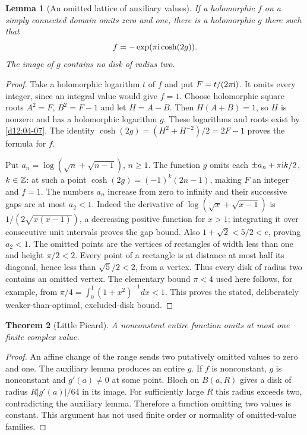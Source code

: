 \documentclass[11pt,a4paper,openany]{book}
\newtheorem{theorem}{Theorem}[chapter]
\newtheorem{lemma}[theorem]{Lemma}
\theoremstyle{definition}
\theoremstyle{remark}\newtheorem{remark}[theorem]{Remark}
\newcommand{\family}[1]{}
\begin{document}
\begin{lemma}[An omitted lattice of auxiliary values]\label{d12:23:auxiliary}
If a holomorphic $f$ on a simply connected domain omits zero and one,
there is a holomorphic $g$ there such that
\[
                      f=-\exp(\pi\mathrm i\cosh(2g)).
\]
The image of $g$ contains no disk of radius two.
\end{lemma}
\begin{proof}
Take a holomorphic logarithm $t$ of $f$ and put $F=t/(2\pi\mathrm i)$.
It omits every integer, since an integral value would give $f=1$.
Choose holomorphic square roots $A^2=F$, $B^2=F-1$ and let $H=A-B$.
Then $H(A+B)=1$, so $H$ is nonzero and has a holomorphic logarithm
$g$. These logarithms and roots exist by \cref{d12:04-07}.
The identity
$\cosh(2g)=(H^2+H^{-2})/2=2F-1$ proves the formula for $f$.

Put $a_n=\log(\sqrt n+\sqrt{n-1})$, $n\ge1$. The function $g$
omits each $\pm a_n+\pi\mathrm i k/2$, $k\in\mathbb Z$: at such a point
$\cosh(2g)=(-1)^k(2n-1)$, making $F$ an integer and $f=1$.
The numbers $a_n$ increase from zero to infinity and their successive
gaps are at most $a_2<1$. Indeed the derivative of
$\log(\sqrt x+\sqrt{x-1})$ is
$1/(2\sqrt{x(x-1)})$, a decreasing positive function for $x>1$;
integrating it over consecutive unit intervals proves the gap bound.
Also $1+\sqrt2<5/2<e$, proving $a_2<1$.
The omitted points are the vertices of rectangles of width less than
one and height $\pi/2<2$. Every point of a rectangle is at distance
at most half its diagonal, hence less than $\sqrt5/2<2$, from a
vertex. Thus every disk of radius two contains an omitted vertex.
The elementary bound $\pi<4$ used here follows, for example, from
$\pi/4=\int_0^1(1+x^2)^{-1}dx<1$. This proves the stated, deliberately
weaker-than-optimal, excluded-disk bound.
\end{proof}

\begin{theorem}[Little Picard]\label{d12:23-02}\family{D12.23.02}
A nonconstant entire function omits at most one finite complex value.
\end{theorem}
\begin{proof}
An affine change of the range sends two putatively omitted values
to zero and one. The auxiliary lemma produces an entire $g$. If $f$
is nonconstant, $g$ is nonconstant and $g'(a)\ne0$ at some point.
Bloch on $B(a,R)$ gives a disk of radius $R|g'(a)|/64$ in its image.
For sufficiently large $R$ this radius exceeds two, contradicting
the auxiliary lemma. Therefore a function omitting two values is
constant. This argument has not used finite order or normality of
omitted-value families.
\end{proof}
\end{document}
